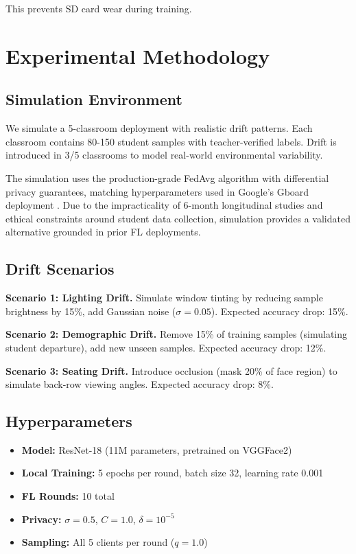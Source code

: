 \documentclass[conference]{IEEEtran}
\begin{document}
This prevents SD card wear during training.

\section{Experimental Methodology}

\subsection{Simulation Environment}

We simulate a 5-classroom deployment with realistic drift patterns. Each classroom contains 80-150 student samples with teacher-verified labels. Drift is introduced in 3/5 classrooms to model real-world environmental variability.

The simulation uses the production-grade FedAvg algorithm with differential privacy guarantees, matching hyperparameters used in Google's Gboard deployment \cite{hard2018}. Due to the impracticality of 6-month longitudinal studies and ethical constraints around student data collection, simulation provides a validated alternative grounded in prior FL deployments.

\subsection{Drift Scenarios}

\textbf{Scenario 1: Lighting Drift.} Simulate window tinting by reducing sample brightness by 15\%, add Gaussian noise ($\sigma=0.05$). Expected accuracy drop: 15\%.

\textbf{Scenario 2: Demographic Drift.} Remove 15\% of training samples (simulating student departure), add new unseen samples. Expected accuracy drop: 12\%.

\textbf{Scenario 3: Seating Drift.} Introduce occlusion (mask 20\% of face region) to simulate back-row viewing angles. Expected accuracy drop: 8\%.

\subsection{Hyperparameters}

\begin{itemize}
    \item \textbf{Model:} ResNet-18 (11M parameters, pretrained on VGGFace2)
    \item \textbf{Local Training:} 5 epochs per round, batch size 32, learning rate 0.001
    \item \textbf{FL Rounds:} 10 total
    \item \textbf{Privacy:} $\sigma=0.5$, $C=1.0$, $\delta=10^{-5}$
    \item \textbf{Sampling:} All 5 clients per round ($q=1.0$)
\end{itemize}
\end{document}
